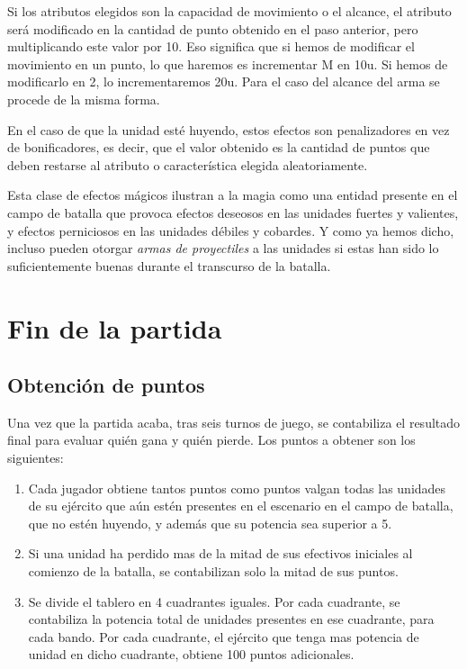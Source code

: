 Si los atributos elegidos son la capacidad de movimiento o el alcance,
el atributo será modificado en la cantidad de punto obtenido en el
paso anterior, pero multiplicando este valor por 10. Eso significa que
si hemos de modificar el movimiento en un punto, lo que haremos es
incrementar M en 10u. Si hemos de modificarlo en 2, lo incrementaremos
20u. Para el caso del alcance del arma se procede de la misma forma.

En el caso de que la unidad esté huyendo, estos efectos son
penalizadores en vez de bonificadores, es decir, que el valor obtenido
es la cantidad de puntos que deben restarse al atributo o
característica elegida aleatoriamente.

Esta clase de efectos mágicos ilustran a la magia como una entidad
presente en el campo de batalla que provoca efectos deseosos en las
unidades fuertes y valientes, y efectos perniciosos en las unidades
débiles y cobardes. Y como ya hemos dicho, incluso pueden otorgar
\emph{armas de proyectiles} a las unidades si estas han sido lo
suficientemente buenas durante el transcurso de la batalla.

\section*{Fin de la partida}
\label{finpartida}
\subsection*{Obtención de puntos}
\label{puntos}
Una vez que la partida acaba, tras seis turnos de juego, se contabiliza el resultado final para evaluar quién gana y quién pierde. Los puntos a obtener son los siguientes:
\begin{enumerate}
\item Cada jugador obtiene tantos puntos como puntos valgan todas las
  unidades de su ejército que aún estén presentes en el escenario en
  el campo de batalla, que no estén huyendo, y además que su potencia
  sea superior a 5.
\item Si una unidad ha perdido mas de la mitad de sus efectivos
  iniciales al comienzo de la batalla, se contabilizan solo la mitad de sus puntos.
\item Se divide el tablero en 4 cuadrantes iguales. Por cada
  cuadrante, se contabiliza la potencia total de unidades presentes en
  ese cuadrante, para cada bando. Por cada cuadrante, el ejército que
  tenga mas potencia de unidad en dicho cuadrante, obtiene 100 puntos
  adicionales.
\end{enumerate}

